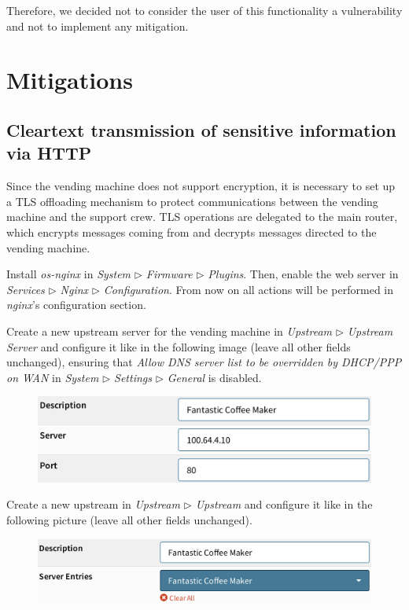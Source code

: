 \documentclass[draft]{homework}
\begin{document}
    Therefore, we decided not to consider the user of this functionality a vulnerability and not to implement any mitigation.
    
    
    \section{Mitigations}
    \subsection{Cleartext transmission of sensitive information via HTTP}
    Since the vending machine does not support encryption, it is necessary to set up a TLS offloading mechanism to protect communications between the vending machine and the support crew.
    TLS operations are delegated to the main router, which encrypts messages coming from and decrypts messages directed to the vending machine. 
    
    Install \textit{os-nginx} in \textit{System} $\triangleright$ \textit{Firmware} $\triangleright$ \textit{Plugins}.
    Then, enable the web server in \textit{Services} $\triangleright$ \textit{Nginx} $\triangleright$ \textit{Configuration}.
    From now on all actions will be performed in \textit{nginx}'s configuration section.
    
    Create a new upstream server for the vending machine in \textit{Upstream} $\triangleright$ \textit{Upstream Server} and configure it like in the following image (leave all other fields unchanged), ensuring that \textit{Allow DNS server list to be overridden by DHCP/PPP on WAN } in \textit{System} $\triangleright$ \textit{Settings} $\triangleright$ \textit{General} is disabled.
    \vspace{-5pt}
    \begin{figure}[H]
        \centering
        \includegraphics[width=\linewidth]{images/upstream-server}
        \label{fig:upstream-server}
    \end{figure}
    \vspace{-20pt}
    
    Create a new upstream in \textit{Upstream} $\triangleright$ \textit{Upstream} and configure it like in the following picture (leave all other fields unchanged).
    \vspace{-5pt}
    \begin{figure}[H]
        \centering
        \includegraphics[width=1\linewidth]{images/upstream}
        \label{fig:upstream}
    \end{figure}
    \vspace{-20pt}
    
\end{document}
